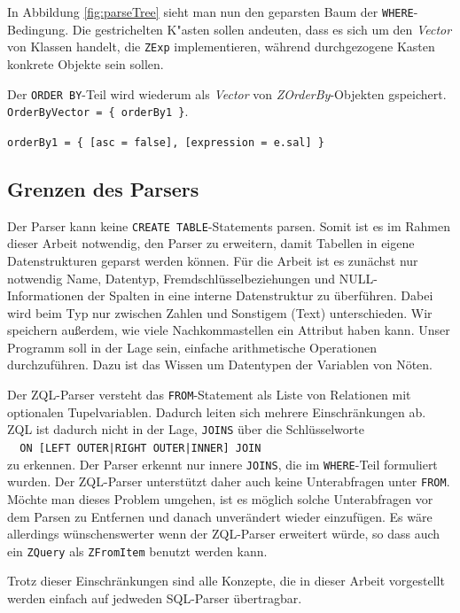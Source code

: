 In Abbildung \ref{fig:parseTree} sieht man nun den geparsten Baum der \verb|WHERE|-Bedingung. Die gestrichelten K"asten sollen andeuten, dass es sich um den \textit{Vector} von Klassen handelt, die \verb|ZExp| implementieren, während durchgezogene Kasten konkrete Objekte sein sollen.

Der \verb|ORDER BY|-Teil wird wiederum als \textit{Vector} von \textit{ZOrderBy}-Objekten gspeichert.\\
\verb|OrderByVector = { orderBy1 }|.

\verb|orderBy1 = { [asc = false], [expression = e.sal] }|

\subsection{Grenzen des Parsers}
\label{subsec:grenzenparser}

Der Parser kann keine \verb|CREATE TABLE|-Statements parsen. Somit ist es im Rahmen dieser Arbeit notwendig, den Parser zu erweitern, damit Tabellen in eigene Datenstrukturen geparst werden können. Für die Arbeit ist es zunächst nur notwendig Name, Datentyp, Fremdschlüsselbeziehungen und NULL-Informationen der Spalten in eine interne Datenstruktur zu überführen. Dabei wird beim Typ nur zwischen Zahlen und Sonstigem (Text) unterschieden. Wir speichern außerdem, wie viele Nachkommastellen ein Attribut haben kann. Unser Programm soll in der Lage sein, einfache arithmetische Operationen durchzuführen. Dazu ist das Wissen um Datentypen der Variablen von Nöten.

Der ZQL-Parser versteht das \verb|FROM|-Statement als Liste von Relationen mit optionalen Tupelvariablen. Dadurch leiten sich mehrere Einschränkungen ab. ZQL ist dadurch nicht in der Lage, \verb|JOINS| über die Schlüsselworte \\\verb#  ON [LEFT OUTER|RIGHT OUTER|INNER] JOIN# \\zu erkennen. Der Parser erkennt nur innere \verb|JOINS|, die im \verb|WHERE|-Teil formuliert wurden. Der ZQL-Parser unterstützt daher auch keine Unterabfragen unter \verb|FROM|. Möchte man dieses Problem umgehen, ist es möglich solche Unterabfragen vor dem Parsen zu Entfernen und danach unverändert wieder einzufügen. Es wäre allerdings wünschenswerter wenn der ZQL-Parser erweitert würde, so dass auch ein \verb|ZQuery| als \verb|ZFromItem| benutzt werden kann.

Trotz dieser Einschränkungen sind alle Konzepte, die in dieser Arbeit vorgestellt werden einfach auf jedweden SQL-Parser übertragbar.


